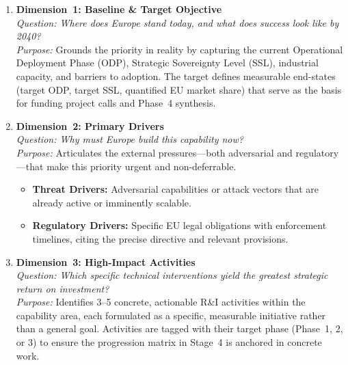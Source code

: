 \documentclass{ieeeaccess}
\begin{document}
\begin{enumerate}

    \item \textbf{Dimension~1: Baseline \& Target Objective}\\
    \textit{Question: Where does Europe stand today, and what does success
    look like by 2040?}\\
    \textit{Purpose:} Grounds the priority in reality by capturing the current
    Operational Deployment Phase (ODP), Strategic Sovereignty Level (SSL),
    industrial capacity, and barriers to adoption. The target defines
    measurable end-states (target ODP, target SSL, quantified EU market share)
    that serve as the basis for funding project calls and Phase~4 synthesis.

    \item \textbf{Dimension~2: Primary Drivers}\\
    \textit{Question: Why must Europe build this capability now?}\\
    \textit{Purpose:} Articulates the external pressures---both adversarial and
    regulatory---that make this priority urgent and non-deferrable.
    \begin{itemize}
        \item \textbf{Threat Drivers:} Adversarial capabilities or attack
        vectors that are already active or imminently scalable.
        \item \textbf{Regulatory Drivers:} Specific EU legal obligations with
        enforcement timelines, citing the precise directive and relevant
        provisions.
    \end{itemize}

    \item \textbf{Dimension~3: High-Impact Activities}\\
    \textit{Question: Which specific technical interventions yield the greatest
    strategic return on investment?}\\
    \textit{Purpose:} Identifies 3--5 concrete, actionable R\&I activities
    within the capability area, each formulated as a specific, measurable
    initiative rather than a general goal. Activities are tagged with their
    target phase (Phase~1, 2, or 3) to ensure the progression matrix in
    Stage~4 is anchored in concrete work.


\end{enumerate}
\end{document}
